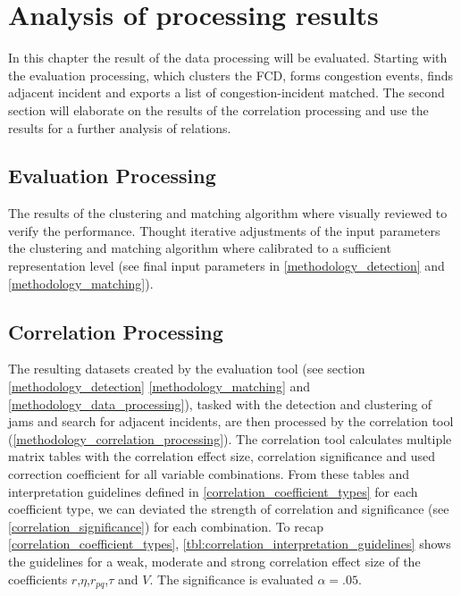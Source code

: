 \chapter{Analysis of processing results}
\label{analysis_processing}
In this chapter the result of the data processing will be evaluated. Starting with the evaluation processing, which clusters the FCD, forms congestion events, finds adjacent incident and exports a list of congestion-incident matched. The second section will elaborate on the results of the correlation processing and use the results for a further analysis of relations.

\section{Evaluation Processing}
The results of the clustering and matching algorithm where visually reviewed to verify the performance. Thought iterative adjustments of the input parameters the clustering and matching algorithm where calibrated to a sufficient representation level (see final input parameters in \cref{methodology_detection} and \cref{methodology_matching}).


\section{Correlation Processing}
\label{analysis_processing_evaluation}
The resulting datasets created by the evaluation tool (see section \cref{methodology_detection} \cref{methodology_matching} and \cref{methodology_data_processing}), tasked with the detection and clustering of jams and search for adjacent incidents, are then processed by the correlation tool (\cref{methodology_correlation_processing}). The correlation tool calculates multiple matrix tables with the correlation effect size, correlation significance and used correction coefficient for all variable combinations. From these tables and interpretation guidelines defined in \cref{correlation_coefficient_types} for each coefficient type, we can deviated the strength of correlation and significance (see \cref{correlation_significance}) for each combination. To recap \cref{correlation_coefficient_types}, \cref{tbl:correlation_interpretation_guidelines} shows the guidelines for a weak, moderate and strong correlation effect size of the coefficients $r$,$\eta$,$r_{pq}$,$\tau$ and $V$. The significance is evaluated $\alpha=.05$.

